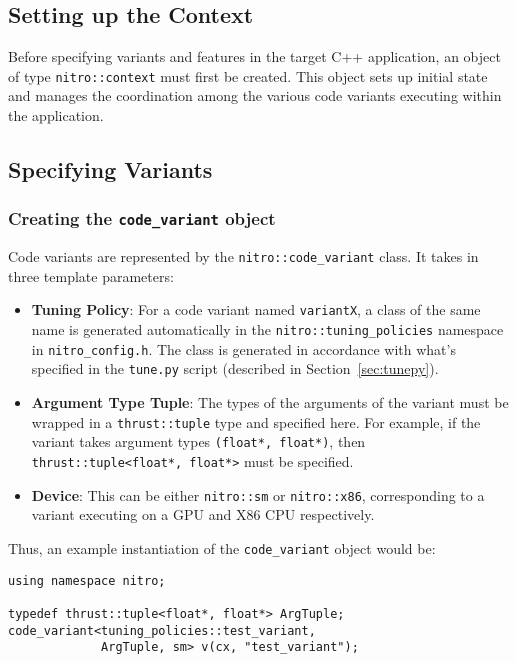 \documentclass[12pt]{article}
\begin{document}
\subsection{Setting up the Context}
Before specifying variants and features in the target C++ application,
an object of type \texttt{nitro::context} must first be created. This object
sets up initial state and manages the coordination among the various
code variants executing within the application.

\subsection{Specifying Variants}

\subsubsection{Creating the \texttt{code\_variant} object}
Code variants are represented by the \texttt{nitro::code\_variant} class.
It takes in three template parameters:

\begin{itemize}
  \item \textbf{Tuning Policy}: For a code variant named \texttt{variantX}, a class of the
  same name is generated automatically in the \texttt{nitro::tuning\_policies} namespace in
  \texttt{nitro\_config.h}. The class is generated in accordance with what's specified in the
  \texttt{tune.py} script (described in Section~\ref{sec:tunepy}).

  \item \textbf{Argument Type Tuple}: The types of the arguments of the variant must be
  wrapped in a \texttt{thrust::tuple} type and specified here. For example, if the variant
  takes argument types \texttt{(float*, float*)}, then \texttt{thrust::tuple<float*, float*>}
  must be specified.

  \item \textbf{Device}: This can be either \texttt{nitro::sm} or \texttt{nitro::x86}, corresponding
  to a variant executing on a GPU and X86 CPU respectively.
\end{itemize}

Thus, an example instantiation of the \texttt{code\_variant} object would be:

\begin{verbatim}
using namespace nitro;

typedef thrust::tuple<float*, float*> ArgTuple;
code_variant<tuning_policies::test_variant,
             ArgTuple, sm> v(cx, "test_variant");
\end{verbatim}
\end{document}
